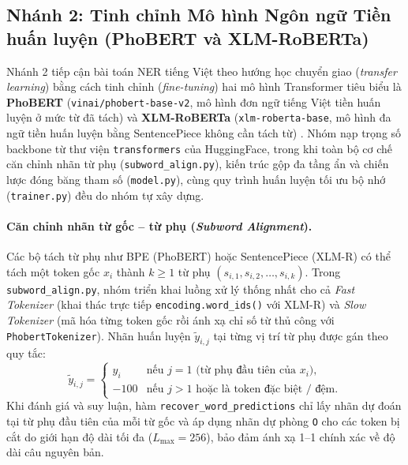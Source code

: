 \subsection{Nhánh 2: Tinh chỉnh Mô hình Ngôn ngữ Tiền huấn luyện (PhoBERT và XLM-RoBERTa)}
\label{sec:method-plm}

Nhánh 2 tiếp cận bài toán NER tiếng Việt theo hướng học chuyển giao (\textit{transfer learning}) bằng cách tinh chỉnh (\textit{fine-tuning}) hai mô hình Transformer tiêu biểu là \textbf{PhoBERT} (\texttt{vinai/phobert-base-v2}, mô hình đơn ngữ tiếng Việt tiền huấn luyện ở mức từ đã tách) \citep{nguyen2020phobert} và \textbf{XLM-RoBERTa} (\texttt{xlm-roberta-base}, mô hình đa ngữ tiền huấn luyện bằng SentencePiece không cần tách từ) \citep{conneau2020xlmr}. Nhóm nạp trọng số backbone từ thư viện \texttt{transformers} của HuggingFace, trong khi toàn bộ cơ chế căn chỉnh nhãn từ phụ (\texttt{subword\_align.py}), kiến trúc gộp đa tầng ẩn và chiến lược đóng băng tham số (\texttt{model.py}), cùng quy trình huấn luyện tối ưu bộ nhớ (\texttt{trainer.py}) đều do nhóm tự xây dựng.

\paragraph{Căn chỉnh nhãn từ gốc -- từ phụ (\textit{Subword Alignment}).}
Các bộ tách từ phụ như BPE (PhoBERT) hoặc SentencePiece (XLM-R) có thể tách một token gốc $x_i$ thành $k \ge 1$ từ phụ $(s_{i,1}, s_{i,2}, \dots, s_{i,k})$. Trong \texttt{subword\_align.py}, nhóm triển khai luồng xử lý thống nhất cho cả \textit{Fast Tokenizer} (khai thác trực tiếp \texttt{encoding.word\_ids()} với XLM-R) và \textit{Slow Tokenizer} (mã hóa từng token gốc rồi ánh xạ chỉ số từ thủ công với \texttt{PhobertTokenizer}). Nhãn huấn luyện $\tilde{y}_{i,j}$ tại từng vị trí từ phụ được gán theo quy tắc:
\begin{equation}
    \tilde{y}_{i,j} =
    \begin{cases}
        y_i & \text{nếu } j = 1 \text{ (từ phụ đầu tiên của } x_i\text{)}, \\
        -100 & \text{nếu } j > 1 \text{ hoặc là token đặc biệt / đệm.}
    \end{cases}
\end{equation}
Khi đánh giá và suy luận, hàm \texttt{recover\_word\_predictions} chỉ lấy nhãn dự đoán tại từ phụ đầu tiên của mỗi từ gốc và áp dụng nhãn dự phòng \texttt{O} cho các token bị cắt do giới hạn độ dài tối đa ($L_{\max}=256$), bảo đảm ánh xạ 1--1 chính xác về độ dài câu nguyên bản.

